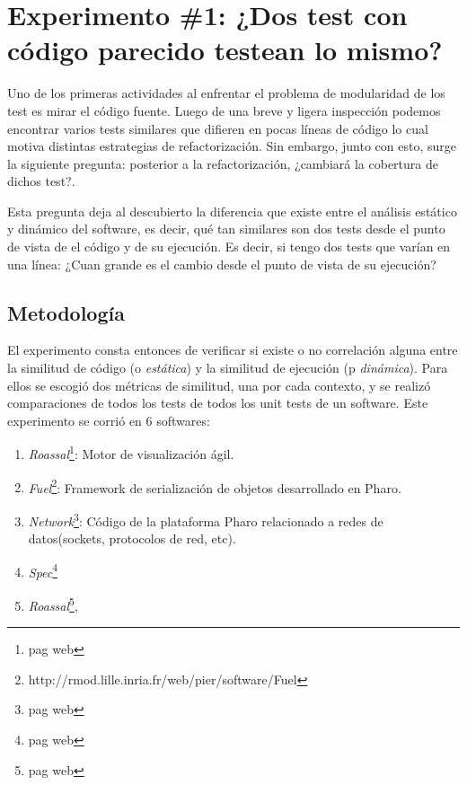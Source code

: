 \chapter{Experimento \#1: ¿Dos test con código parecido testean lo mismo? }

\par Uno de los primeras actividades al enfrentar el problema de modularidad de los test es mirar el código fuente. Luego de una breve y ligera inspección podemos encontrar varios tests similares que difieren en pocas líneas de código lo cual motiva distintas estrategias de refactorización. Sin embargo, junto con esto, surge la siguiente pregunta: posterior a la refactorización, ¿cambiará la cobertura de dichos test?. 

\par Esta pregunta deja al descubierto la diferencia que existe entre el análisis estático y dinámico del software, es decir, qué tan similares son dos tests desde el punto de vista de el código y de su ejecución. Es decir, si tengo dos tests que varían en una línea: ¿Cuan grande es el cambio desde el punto de vista de su ejecución?

\section{Metodología}

\par El experimento consta entonces de verificar si existe o no correlación alguna entre la similitud de código (o \emph{estática}) y la similitud de ejecución (p \emph{dinámica}). Para ellos se escogió dos métricas de similitud, una por cada contexto, y se realizó comparaciones de todos los tests de todos los unit tests de un software. Este experimento se corrió en 6 softwares: 

\begin{enumerate} 
\item \emph{Roassal}\footnote{pag web}: Motor de visualización ágil.
\item \emph{Fuel}\footnote{http://rmod.lille.inria.fr/web/pier/software/Fuel}: Framework de serialización de objetos desarrollado en Pharo.
\item \emph{Network}\footnote{pag web}: Código de la plataforma Pharo relacionado a redes de datos(sockets, protocolos de red, etc).
\item \emph{Spec}\footnote{pag web}
\item \emph{Roassal}\footnote{pag web},
\end{enumerate}

